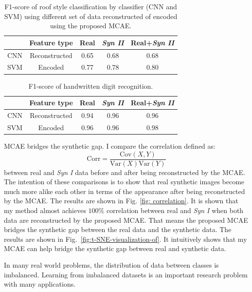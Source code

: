 \documentclass{iitthesis}
\begin{document}
\begin{table}[h]
\protect\caption{F1-score of roof style classification by classifier (CNN and SVM)
using different set of data reconstructed of encoded using the proposed
MCAE.}
\centering %
\begin{tabular}{lcccc}
\hline \hline
 & Feature type  & Real  & \textit{Syn II}  & Real+\textit{Syn II} \tabularnewline
\midrule 
CNN & Reconstructed  & 0.65  & 0.68  & 0.68 \tabularnewline
SVM & Encoded  & 0.77  & 0.78  & 0.80 \tabularnewline
\hline
\end{tabular}
\label{Tab: RoofBetterData} 
\end{table}

\begin{table}[h]
\protect\caption{F1-score of handwritten digit recognition.}
\centering %
\begin{tabular}{@{}lcccc@{}}
\hline \hline
 & Feature type  & Real  & \textit{Syn II}  & Real+\textit{Syn II} \tabularnewline
\hline 
CNN  & Reconstructed  & 0.94  & 0.96  & 0.96 \tabularnewline
SVM  & Encoded  & 0.96  & 0.96  & 0.98 \tabularnewline
\hline
\end{tabular}
\label{Tab: DigitBetterData} 
\end{table}

MCAE bridges the synthetic gap. I compare the correlation
defined as: 
\begin{equation}
\text{Corr}=\frac{\text{Cov}(X,Y)}{\text{Var}(X)\text{Var}(Y)}
\end{equation}
between real and \textit{Syn I} data before and after being reconstructed by the MCAE. The intention of these comparisons is to show that real synthetic images become much more alike each other in terms of the
appearance after being reconstructed by the MCAE. The results are shown in Fig. \ref{fig: correlation}. It is shown that my method almost achieves $100\%$ correlation between real and \textit{Syn I} when both data are reconstructed by the proposed MCAE. That means the proposed MCAE bridges the synthetic gap between the real data
and the synthetic data. The results are shown in Fig.~\ref{fig:t-SNE-visualization-of}. It intuitively shows that my MCAE can help bridge the synthetic gap between real and synthetic data.

\clearpage

 \label{chapter: feature space}


In many real world problems, the distribution of data between classes is imbalanced. Learning from imbalanced datasets is an important research problem with many applications.
\end{document}
